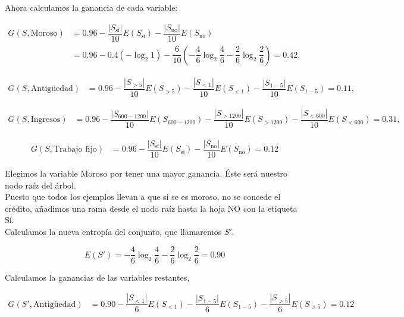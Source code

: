 \begin{ejemplo}
	Ahora calculamos la ganancia de cada variable:
	
	\begin{align*}
	G(S, \text{Moroso}) & = 0.96 - \dfrac{|S_\text{sí}|}{10}E(S_\text{sí}) - \dfrac{|S_\text{no}|}{10}E(S_\text{no}) \\
	                    & = 0.96 - 0.4 \left(-\log_2 1\right) - \dfrac{6}{10} \left( -\dfrac{4}{6} \log_2 \dfrac{4}{6} - \dfrac{2}{6} \log_2 \dfrac{2}{6} \right) = 0.42,
	\end{align*}
	
	\begin{align*}
	G(S, \text{Antigüedad}) & = 0.96 - \dfrac{|S_{>5}|}{10} E(S_{>5}) - \dfrac{|S_{<1}|}{10} E(S_{<1}) - \dfrac{|S_{1-5}|}{10} E(S_{1-5}) = 0.11,
	\end{align*}
	
	\begin{align*}
	G(S, \text{Ingresos}) & = 0.96 - \dfrac{|S_{600-1200}|}{10} E(S_{600-1200}) - \dfrac{|S_{>1200}|}{10} E(S_{>1200}) - \dfrac{|S_{<600}|}{10} E(S_{<600}) = 0.31,
	\end{align*}
	
	\begin{align*}
	G(S, \text{Trabajo fijo}) & = 0.96 - \dfrac{|S_{\text{sí}}|}{10} E(S_\text{sí}) - \dfrac{|S_{\text{no}}|}{10} E(S_\text{no}) = 0.12
	\end{align*}
	
	Elegimos la variable Moroso por tener una mayor ganancia. Éste será nuestro nodo raíz del árbol.\\
	
	Puesto que todos los ejemplos llevan a que si se es moroso, no se concede el crédito, añadimos una rama desde el nodo raíz hasta la hoja NO con la etiqueta Sí.\\
	
	Calculamos la nueva entropía del conjunto, que llamaremos $S'$.
	
	\begin{equation*}
	E(S') = -\dfrac{4}{6}\log_2 \dfrac{4}{6} - \dfrac{2}{6} \log_2 \dfrac{2}{6} = 0.90
	\end{equation*}
	
	Calculamos la ganancias de las variables restantes,
	
	\begin{align*}
	G(S', \text{Antigüedad}) & = 0.90 - \dfrac{|S_{<1}|}{6}E(S_{<1}) - \dfrac{|S_{1-5}|}{6}E(S_{1-5}) - \dfrac{|S_{>5}|}{6}E(S_{>5}) = 0.12
	\end{align*}
	

\end{ejemplo}
